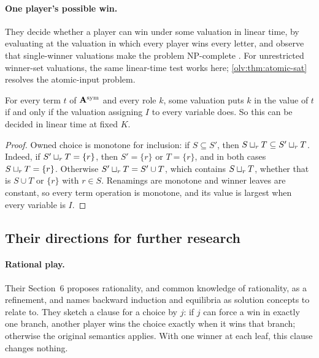 \paragraph{One player's possible win.} They decide whether a player can win under some valuation in linear time, by evaluating at the valuation in which every player wins every letter, and observe that single-winner valuations make the problem NP-complete \cite[Theorem~5.49]{OldeLoohuisVenema2010}. For unrestricted winner-set valuations, the same linear-time test works here; \cref{olv:thm:atomic-sat} resolves the atomic-input problem.

\begin{proposition}\label{olv:prop:sat}
For every term $t$ of $\mathbf A^{\rm sym}$ and every role $k$, some valuation puts $k$ in the value of $t$ if and only if the valuation assigning $I$ to every variable does. So this can be decided in linear time at fixed $K$.
\end{proposition}
\begin{proof}
Owned choice is monotone for inclusion: if $S\subseteq S'$, then $S\mathbin{\sqcup_{r}} T\subseteq S'\mathbin{\sqcup_{r}} T$. Indeed, if $S'\mathbin{\sqcup_{r}} T=\{r\}$, then $S'=\{r\}$ or $T=\{r\}$, and in both cases $S\mathbin{\sqcup_{r}} T=\{r\}$. Otherwise $S'\mathbin{\sqcup_{r}} T=S'\cup T$, which contains $S\mathbin{\sqcup_{r}} T$, whether that is $S\cup T$ or $\{r\}$ with $r\in S$. Renamings are monotone and winner leaves are constant, so every term operation is monotone, and its value is largest when every variable is $I$.
\end{proof}



\subsection{Their directions for further research}

\paragraph{Rational play.} Their Section~6 proposes rationality, and common knowledge of rationality, as a refinement, and names backward induction and equilibria as solution concepts to relate to. They sketch a clause for a choice by $j$: if $j$ can force a win in exactly one branch, another player wins the choice exactly when it wins that branch; otherwise the original semantics applies. With one winner at each leaf, this clause changes nothing.

